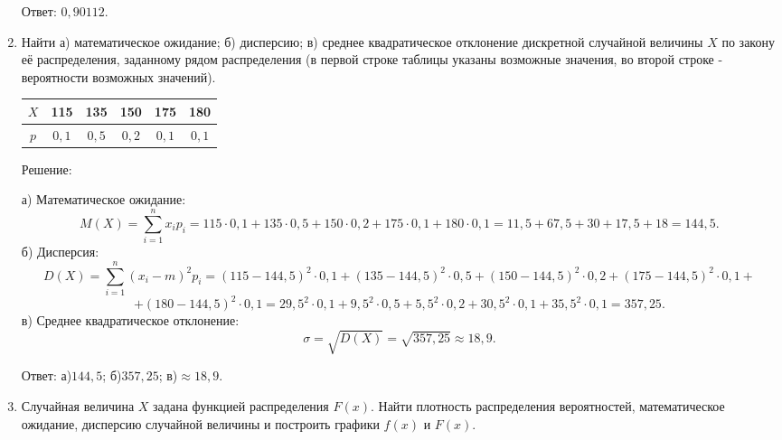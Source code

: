 \documentclass{article}
\begin{document}
\begin{enumerate}
Ответ: $0,90112$.

\item %
Найти а) математическое ожидание; б) дисперсию; в) среднее квадратическое отклонение дискретной случайной величины $X$ по закону её распределения, заданному рядом распределения (в первой строке таблицы указаны возможные значения, во второй строке - вероятности возможных значений).

\begin{center}
\begin{tabular}{|c|c|c|c|c|c|}
\hline
$X$ & 115 & 135 & 150 & 175 & 180 \\
\hline
$p$ & $0,1$ & $0,5$ & $0,2$ & $0,1$ & $0,1$ \\
\hline
\end{tabular}
\end{center}
\begin{center}Решение:\end{center}
а) Математическое ожидание: $$M(X)=\sum_{i=1}^n x_i p_i=115\cdot0,1+135\cdot0,5+150\cdot0,2+175\cdot0,1+180\cdot0,1=11,5+67,5+30+17,5+18=144,5.$$
б) Дисперсия:
$$D(X)=\sum_{i=1}^n (x_i-m)^2 p_i=(115-144,5)^2\cdot0,1+(135-144,5)^2\cdot0,5+(150-144,5)^2\cdot0,2+(175-144,5)^2\cdot0,1+$$
$$+(180-144,5)^2\cdot0,1=29,5^2\cdot0,1+9,5^2\cdot0,5+5,5^2\cdot0,2+30,5^2\cdot0,1+35,5^2\cdot0,1=357,25.$$
в) Среднее квадратическое отклонение:
$$\sigma=\sqrt{D(X)}=\sqrt{357,25}\approx18,9.$$

Ответ: а)$144,5$; б)$357,25$; в)$\approx18,9$.

\item %
Случайная величина $X$ задана функцией распределения $F(x)$. Найти плотность распределения вероятностей, математическое ожидание, дисперсию случайной величины и построить графики $f(x)$ и $F(x)$.


\end{enumerate}
\end{document}
